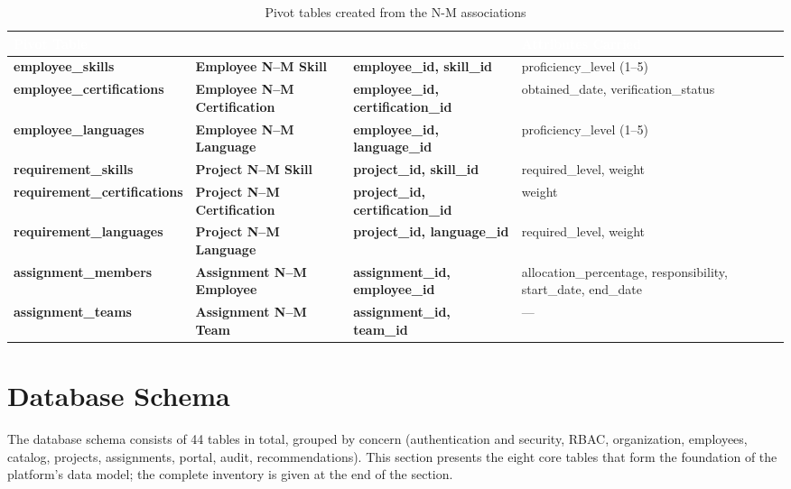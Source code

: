 \documentclass{bts-report}
\begin{document}
\begin{table}[H]
  \centering
  \caption{Pivot tables created from the N-M associations}
  \label{tab:relational-pivot}
  \begin{tabularx}{\textwidth}{|>{\bfseries}p{3.4cm}|>{\bfseries}p{4.0cm}|>{\bfseries}p{3.4cm}|X|}
    \hline
    \rowcolor{tableheader}
    \textcolor{white}{\textbf{Pivot Table}} & \multicolumn{1}{c|}{\textcolor{white}{\textbf{Association}}} & \multicolumn{1}{c|}{\textcolor{white}{\textbf{Foreign Keys}}} & \textcolor{white}{\textbf{Attributes Carried}} \\
    \hline
    employee\_skills & Employee N--M Skill & employee\_id, skill\_id & proficiency\_level (1--5) \\
    \hline
    employee\_certifications & Employee N--M Certification & employee\_id, certification\_id & obtained\_date, verification\_status \\
    \hline
    employee\_languages & Employee N--M Language & employee\_id, language\_id & proficiency\_level (1--5) \\
    \hline
    requirement\_skills & Project N--M Skill & project\_id, skill\_id & required\_level, weight \\
    \hline
    requirement\_certifications & Project N--M Certification & project\_id, certification\_id & weight \\
    \hline
    requirement\_languages & Project N--M Language & project\_id, language\_id & required\_level, weight \\
    \hline
    assignment\_members & Assignment N--M Employee & assignment\_id, employee\_id & allocation\_percentage, responsibility, start\_date, end\_date \\
    \hline
    assignment\_teams & Assignment N--M Team & assignment\_id, team\_id & --- \\
    \hline
  \end{tabularx}
\end{table}

\section{Database Schema}

The database schema consists of 44 tables in total, grouped by concern (authentication and security, RBAC, organization, employees, catalog, projects, assignments, portal, audit, recommendations). This section presents the eight core tables that form the foundation of the platform's data model; the complete inventory is given at the end of the section.
\end{document}
